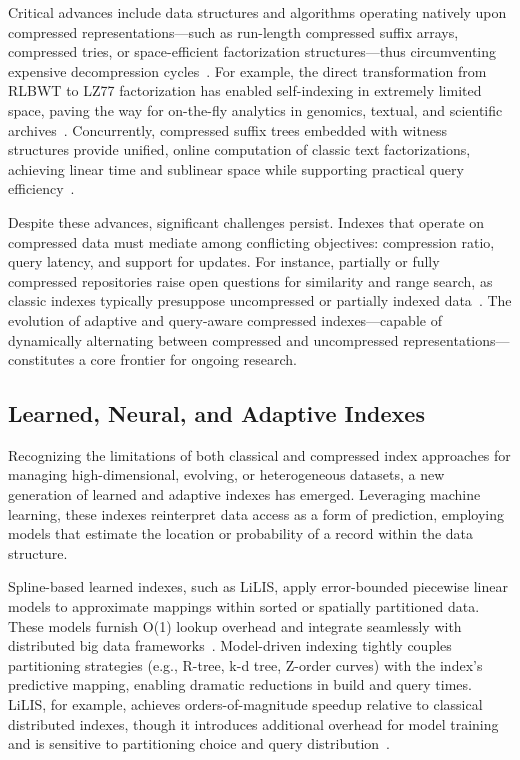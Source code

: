 Critical advances include data structures and algorithms operating natively upon compressed representations—such as run-length compressed suffix arrays, compressed tries, or space-efficient factorization structures—thus circumventing expensive decompression cycles~\cite{ref80,ref81,ref82,ref87,ref106,ref108,ref109,ref118}. For example, the direct transformation from RLBWT to LZ77 factorization has enabled self-indexing in extremely limited space, paving the way for on-the-fly analytics in genomics, textual, and scientific archives~\cite{ref108}. Concurrently, compressed suffix trees embedded with witness structures provide unified, online computation of classic text factorizations, achieving linear time and sublinear space while supporting practical query efficiency~\cite{ref109}.

Despite these advances, significant challenges persist. Indexes that operate on compressed data must mediate among conflicting objectives: compression ratio, query latency, and support for updates. For instance, partially or fully compressed repositories raise open questions for similarity and range search, as classic indexes typically presuppose uncompressed or partially indexed data~\cite{ref118}. The evolution of adaptive and query-aware compressed indexes—capable of dynamically alternating between compressed and uncompressed representations—constitutes a core frontier for ongoing research.

\subsection{Learned, Neural, and Adaptive Indexes}

Recognizing the limitations of both classical and compressed index approaches for managing high-dimensional, evolving, or heterogeneous datasets, a new generation of learned and adaptive indexes has emerged. Leveraging machine learning, these indexes reinterpret data access as a form of prediction, employing models that estimate the location or probability of a record within the data structure.

Spline-based learned indexes, such as LiLIS, apply error-bounded piecewise linear models to approximate mappings within sorted or spatially partitioned data. These models furnish O(1) lookup overhead and integrate seamlessly with distributed big data frameworks~\cite{ref110}. Model-driven indexing tightly couples partitioning strategies (e.g., R-tree, k-d tree, Z-order curves) with the index’s predictive mapping, enabling dramatic reductions in build and query times. LiLIS, for example, achieves orders-of-magnitude speedup relative to classical distributed indexes, though it introduces additional overhead for model training and is sensitive to partitioning choice and query distribution~\cite{ref110}.

